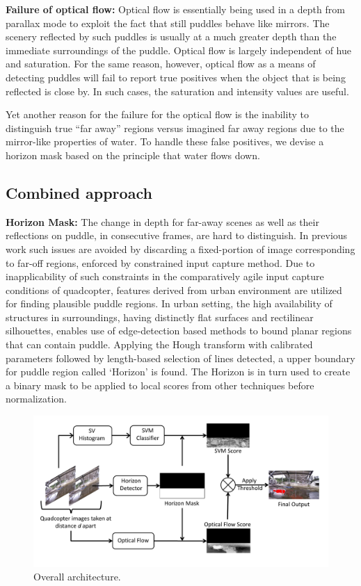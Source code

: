 \documentclass[times,10pt,twocolumn]{article}
\begin{document}
\textbf{Failure of optical flow:} Optical flow is essentially being
used in a depth from parallax mode to exploit the fact that still
puddles behave like mirrors. The scenery reflected by such puddles is
usually at a much greater depth than the immediate surroundings of the
puddle.  Optical flow is largely independent of hue and saturation.
For the same reason, however, optical flow as a means of detecting
puddles will fail to report true positives when the object that is
being reflected is close by. In such cases, the saturation and
intensity values are useful.

Yet another reason for the failure for the optical flow is the
inability to distinguish true ``far away'' regions versus imagined far
away regions due to the mirror-like properties of water.  To handle
these false positives, we devise a horizon mask based on the principle
that water flows down.

\subsection{Combined approach}
\textbf{Horizon Mask:} The change in depth for far-away scenes as well
as their reflections on puddle, in consecutive frames, are hard to
distinguish. In previous work \cite{rankin11} such issues are avoided
by discarding a fixed-portion of image corresponding to far-off
regions, enforced by constrained input capture method. Due to
inapplicability of such constraints in the comparatively agile input
capture conditions of quadcopter, features derived from urban
environment are utilized for finding plausible puddle regions. In
urban setting, the high availability of structures in surroundings,
having distinctly flat surfaces and rectilinear silhouettes, enables
use of edge-detection based methods to bound planar regions that can
contain puddle. Applying the Hough transform with calibrated
parameters followed by length-based selection of lines detected, a
upper boundary for puddle region called `Horizon' is found. The
Horizon is in turn used to create a binary mask to be applied to local
scores from other techniques before normalization.


\begin{figure}[h!]
  \centering
  \includegraphics[width=0.9\linewidth]{images/overall_workflow.pdf}
  \caption{Overall architecture.}
  \label{fig:workflow}
\end{figure}
\end{document}
